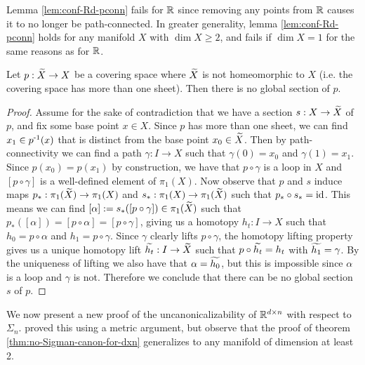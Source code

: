 \begin{remark}
    Lemma \ref{lem:conf-Rd-pconn} fails for $\R$ since removing any points from $\R$ causes it to no longer be path-connected.
    In greater generality, lemma \ref{lem:conf-Rd-pconn} holds for any manifold $X$ with $\dim X \geq 2$, and fails if $\dim X = 1$ for the same reasons as for $\R$.
\end{remark}

\begin{lemma}\label{lem:cover-no-section}
    Let $p : \Tilde{X} \to X$ be a covering space where $\Tilde{X}$ is not homeomorphic to $X$ (i.e. the covering space has more than one sheet).
    Then there is no global section of $p$.
    \begin{proof}
        Assume for the sake of contradiction that we have a section $s : X \to \Tilde{X}$ of $p$, and fix some base point $x \in X$.
        Since $p$ has more than one sheet, we can find $x_1 \in \inv{p}(x)$ that is distinct from the base point $x_0 \in \Tilde{X}$.
        Then by path-connectivity we can find a path $\gamma : I \to X$ such that $\gamma(0) = x_0$ and $\gamma(1) = x_1$.
        Since $p(x_0) = p(x_1)$ by construction, we have that $p \circ \gamma$ is a loop in $X$ and $[p \circ \gamma]$ is a well-defined element of $\pi_1(X)$.
        Now observe that $p$ and $s$ induce maps $p_* : \pi_1(\Tilde{X}) \to \pi_1(X)$ and $s_* : \pi_1(X) \to \pi_1(\Tilde{X})$ such that $p_* \circ s_* = \id$.
        This means we can find $[\alpha] := s_*([p \circ \gamma]) \in \pi_1(\Tilde{X})$ such that $p_*([\alpha]) = [p \circ \alpha] = [p \circ \gamma]$, giving us a homotopy $h_t : I \to X$ such that $h_0 = p \circ \alpha$ and $h_1 = p \circ \gamma$.
        Since $\gamma$ clearly lifts $p \circ \gamma$, the homotopy lifting property gives us a unique homotopy lift $\Tilde{h_t} : I \to \Tilde{X}$ such that $p \circ \Tilde{h_t} = h_t$ with $\Tilde{h_1} = \gamma$.
        By the uniqueness of lifting we also have that $\alpha = \Tilde{h_0}$, but this is impossible since $\alpha$ is a loop and $\gamma$ is not.
        Therefore we conclude that there can be no global section $s$ of $p$.
    \end{proof}
\end{lemma}

We now present a new proof of the uncanonicalizability of $\R^{d \times n}$ with respect to $\Sigma_n$.
\cite{zhang2020fspoollearningsetrepresentations} proved this using a metric argument, but observe that the proof of theorem \ref{thm:no-Sigman-canon-for-dxn} generalizes to any manifold of dimension at least 2. %


